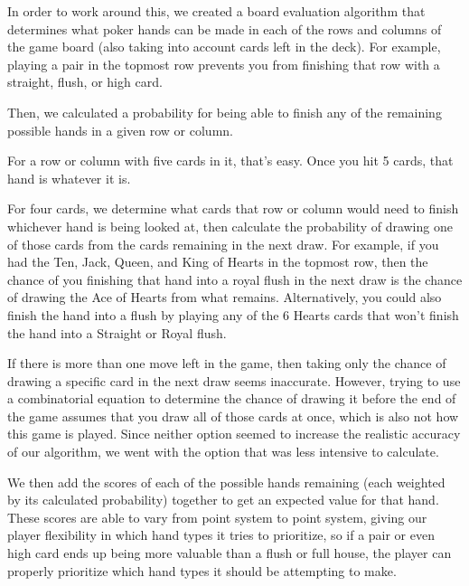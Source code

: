 \documentclass[letterpaper]{article}
\begin{document}
In order to work around this, we created a board evaluation algorithm that determines what poker hands can be made in each of the rows and columns of the game board (also taking into account cards left in the deck). For example, playing a pair in the topmost row prevents you from finishing that row with a straight, flush, or high card.

Then, we calculated a probability for being able to finish any of the remaining possible hands in a given row or column. 

For a row or column with five cards in it, that’s easy. Once you hit 5 cards, that hand is whatever it is.

For four cards, we determine what cards that row or column would need to finish whichever hand is being looked at, then calculate the probability of drawing one of those cards from the cards remaining in the next draw. For example, if you had the Ten, Jack, Queen, and King of Hearts in the topmost row, then the chance of you finishing that hand into a royal flush in the next draw is the chance of drawing the Ace of Hearts from what remains. Alternatively, you could also finish the hand into a flush by playing any of the 6 Hearts cards that won’t finish the hand into a Straight or Royal flush.

If there is more than one move left in the game, then taking only the chance of drawing a specific card in the next draw seems inaccurate. However, trying to use a combinatorial equation to determine the chance of drawing it before the end of the game assumes that you draw all of those cards at once, which is also not how this game is played. Since neither option seemed to increase the realistic accuracy of our algorithm, we went with the option that was less intensive to calculate.

We then add the scores of each of the possible hands remaining (each weighted by its calculated probability) together to get an expected value for that hand. These scores are able to vary from point system to point system, giving our player flexibility in which hand types it tries to prioritize, so if a pair or even high card ends up being more valuable than a flush or full house, the player can properly prioritize which hand types it should be attempting to make.
\end{document}
